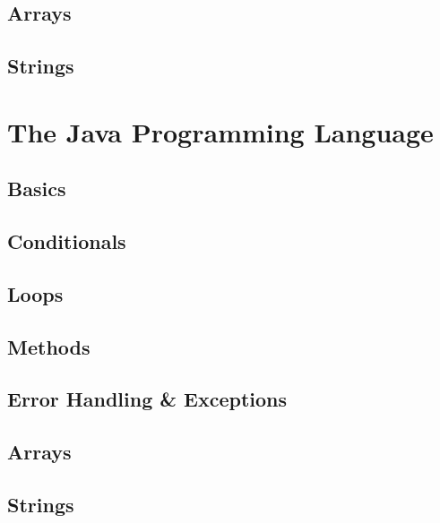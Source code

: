 \documentclass[12pt]{scrbook}
\begin{document}
\chapter{Arrays}
\label{chapter:c:arrays}


\chapter{Strings}
\label{chapter:c:strings}


\part{The Java Programming Language}

\chapter{Basics}


\chapter{Conditionals}


\chapter{Loops}


\chapter{Methods}


\chapter{Error Handling \& Exceptions}
\label{chapter:java:errorHandling}


\chapter{Arrays}
\label{chapter:java:arrays}


\chapter{Strings}
\label{chapter:java:strings}

\end{document}
